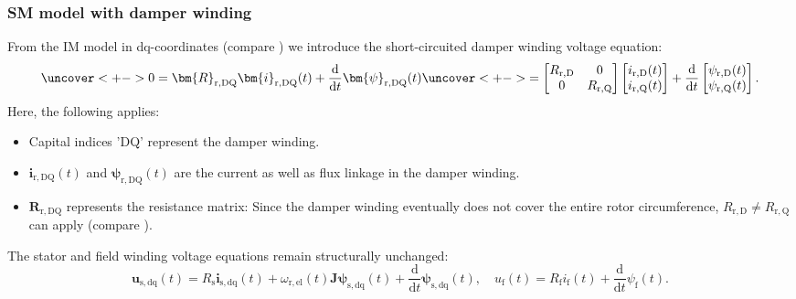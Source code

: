 \begin{frame}
	\frametitle{SM model with damper winding}
	From the IM model in dq-coordinates (compare ) we introduce the short-circuited damper winding voltage equation:
	\begin{equation}
		\uncover<+->{
		0 = \bm{R}_{\mathrm{r,DQ}} \bm{i}_{\mathrm{r,DQ}}(t) + \frac{\mathrm{d}}{\mathrm{d}t}\bm{\psi}_{\mathrm{r,DQ}}(t)} \uncover<+->{= \begin{bmatrix}
			R_\mathrm{r,D} & 0 \\ 0 & R_\mathrm{r,Q} 
		\end{bmatrix} \begin{bmatrix}
			i_{\mathrm{r,D}}(t) \\ i_{\mathrm{r,Q}}(t)
		\end{bmatrix} + \frac{\mathrm{d}}{\mathrm{d}t} \begin{bmatrix}
			\psi_{\mathrm{r,D}}(t) \\ \psi_{\mathrm{r,Q}}(t)
		\end{bmatrix}.}
		\label{eq:damper_winding_voltage}
	\end{equation}
	\onslide<+->
	Here, the following applies:
	\begin{itemize}
		\item<+-> Capital indices 'DQ' represent the damper winding.
		\item<+-> $\bm{i}_{\mathrm{r,DQ}}(t)$ and $\bm{\psi}_{\mathrm{r,DQ}}(t)$ are the current as well as flux linkage in the damper winding.
		\item<+-> $\bm{R}_{\mathrm{r,DQ}}$ represents the resistance matrix: Since the damper winding eventually does not cover the entire rotor circumference, $R_\mathrm{r,D}\neq R_\mathrm{r,Q}$ can apply (compare ). 
	\end{itemize} 
	\onslide<+->
	The stator and field winding voltage equations remain structurally unchanged:
	$$\bm{u}_\mathrm{s,dq}(t) = R_\mathrm{s} \bm{i}_\mathrm{s,dq}(t)+ \omega_\mathrm{r,el}(t)\bm{J}\bm{\psi}_\mathrm{s,dq}(t) + \frac{\mathrm{d}}{\mathrm{d}t}\bm{\psi}_\mathrm{s,dq}(t), \quad u_\mathrm{f}(t) = R_\mathrm{f}i_\mathrm{f}(t)+\frac{\mathrm{d}}{\mathrm{d}t}\psi_\mathrm{f}(t).$$
\end{frame}

